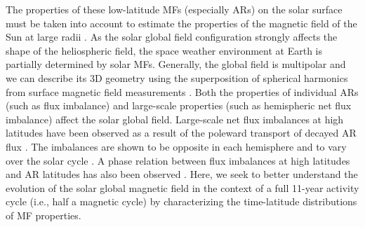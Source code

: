 \documentclass[namedreferences]{solarphysics}
\begin{document}
\begin{article}
The properties of these low-latitude MFs (especially ARs) on the solar surface must be taken into account to estimate the properties of the magnetic field of the Sun at large radii \citep[e.g., the interplanetary magnetic field:][]{Schatten:1969,wang:2003a, Schrijver:2003, schussler:2006}. As the solar global field configuration strongly affects the shape of the heliospheric field, the space weather environment at Earth is partially determined by solar MFs. Generally, the global field is multipolar and we can describe its 3D geometry using the superposition of spherical harmonics from surface magnetic field measurements \citep{stenflo:1986, stenflo:1988, knaack:2005,mordvinov:2007,Mackay:2012,DeRosa:2012}. Both the properties of individual ARs (such as flux imbalance) and large-scale properties (such as hemispheric net flux imbalance) affect the solar global field. Large-scale net flux imbalances at high latitudes have been observed as a result of the poleward transport of decayed AR flux \citep{harvey:1992}. The imbalances are shown to be opposite in each hemisphere and to vary over the solar cycle \citep{Choudhary:2002}. A phase relation between flux imbalances at high latitudes and AR latitudes has also been observed \citep{zharkov:2006,Zharkov:2008}.
Here, we seek to better understand the evolution of the solar global magnetic field in the context of a full 11-year activity cycle (i.e., half a magnetic cycle) by characterizing the time-latitude distributions of MF properties.



\end{article}
\end{document}
